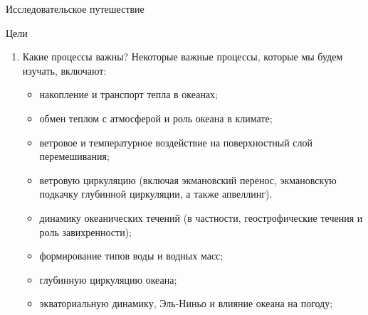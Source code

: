\begin{chapter}{Исследовательское путешествие}
\begin{section}{Цели}
\begin{enumerate}
\item
Какие процессы важны? Некоторые важные процессы, которые мы будем изучать, 
включают:
%
\begin{itemize}
  \item
  накопление и транспорт тепла в океанах;
%

  \item
  обмен теплом с атмосферой и роль океана в климате; 
%

  \item
  ветровое и температурное воздействие на поверхностный слой перемешивания; 
%

  \item
  ветровую циркуляцию (включая экмановский перенос, экмановскую подкачку
  глубинной циркуляции, а также апвеллинг). 
%

  \item
  динамику океанических течений (в частности, геострофические течения и роль 
  завихренности); 
%

  \item
  формирование типов воды и водных масс;
%

  \item
  глубинную циркуляцию океана; 
%

  \item
  экваториальную динамику, Эль-Ниньо и влияние океана на погоду; 
%


\end{itemize}
\end{enumerate}
\end{section}
\end{chapter}
